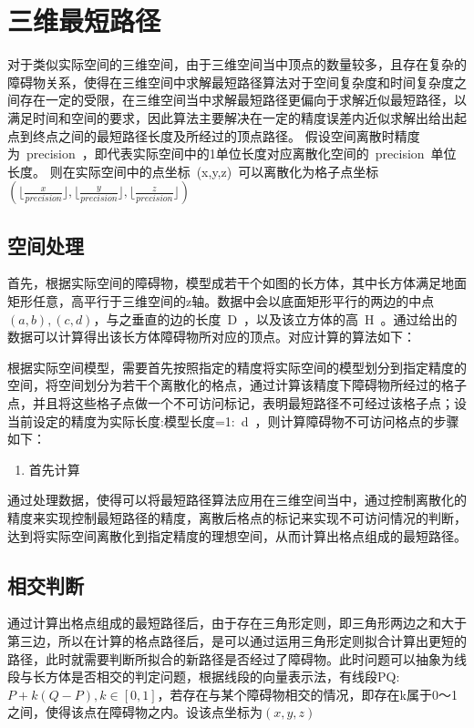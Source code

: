 \section{三维最短路径}
\par 对于类似实际空间的三维空间，由于三维空间当中顶点的数量较多，且存在复杂的障碍物关系，使得在三维空间中求解最短路径算法对于空间复杂度和时间复杂度之间存在一定的受限，在三维空间当中求解最短路径更偏向于求解近似最短路径，以满足时间和空间的要求，因此算法主要解决在一定的精度误差内近似求解出给出起点到终点之间的最短路径长度及所经过的顶点路径。
假设空间离散时精度为~precision~，即代表实际空间中的1单位长度对应离散化空间的~precision~单位长度。
则在实际空间中的点坐标~(x,y,z)~可以离散化为格子点坐标$(\lfloor\frac{x}{precision}\rfloor,\lfloor\frac{y}{precision}\rfloor,\lfloor\frac{z}{precision}\rfloor)$

\subsection{空间处理}
\par 首先，根据实际空间的障碍物，模型成若干个如图的长方体，其中长方体满足地面矩形任意，高平行于三维空间的z轴。数据中会以底面矩形平行的两边的中点$(a,b),(c,d)$，与之垂直的边的长度~D~，以及该立方体的高~H~。通过给出的数据可以计算得出该长方体障碍物所对应的顶点。对应计算的算法如下：
\par 根据实际空间模型，需要首先按照指定的精度将实际空间的模型划分到指定精度的空间，将空间划分为若干个离散化的格点，通过计算该精度下障碍物所经过的格子点，并且将这些格子点做一个不可访问标记，表明最短路径不可经过该格子点；设当前设定的精度为实际长度:模型长度=1:~d~，则计算障碍物不可访问格点的步骤如下：
\begin{enumerate}
    \item 首先计算
\end{enumerate}
\par 通过处理数据，使得可以将最短路径算法应用在三维空间当中，通过控制离散化的精度来实现控制最短路径的精度，离散后格点的标记来实现不可访问情况的判断，达到将实际空间离散化到指定精度的理想空间，从而计算出格点组成的最短路径。

\subsection{相交判断}
\par 通过计算出格点组成的最短路径后，由于存在三角形定则，即三角形两边之和大于第三边，所以在计算的格点路径后，是可以通过运用三角形定则拟合计算出更短的路径，此时就需要判断所拟合的新路径是否经过了障碍物。此时问题可以抽象为线段与长方体是否相交的判定问题，根据线段的向量表示法，有线段PQ:$P+k(Q-P),k\in [0,1]$，若存在与某个障碍物相交的情况，即存在k属于0～1之间，使得该点在障碍物之内。设该点坐标为$(x,y,z)$

